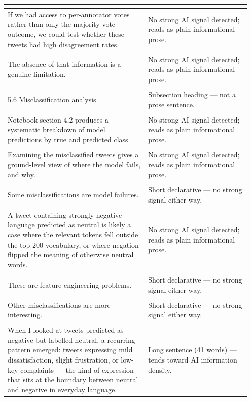 \documentclass[11pt]{article}
\begin{document}
\begin{longtable}{|p{0.55\linewidth}|p{0.40\linewidth}|}
\begin{itemize}[leftmargin=*,topsep=2pt,itemsep=1pt,parsep=0pt]
\end{itemize} & \\
\hline
If we had access to per-annotator votes rather than only the majority-vote outcome, we could test whether these tweets had high disagreement rates. & No strong AI signal detected; reads as plain informational prose. \\[2pt]
\hline
\rule{0pt}{3.5cm} & \\
\hline
The absence of that information is a genuine limitation. & No strong AI signal detected; reads as plain informational prose. \\[2pt]
\hline
\rule{0pt}{3.5cm} & \\
\hline
5.6 Misclassification analysis & Subsection heading --- not a prose sentence. \\[2pt]
\hline
\rule{0pt}{3.5cm} & \\
\hline
Notebook section 4.2 produces a systematic breakdown of model predictions by true and predicted class. & No strong AI signal detected; reads as plain informational prose. \\[2pt]
\hline
\rule{0pt}{3.5cm} & \\
\hline
Examining the misclassified tweets gives a ground-level view of where the model fails, and why. & No strong AI signal detected; reads as plain informational prose. \\[2pt]
\hline
\rule{0pt}{3.5cm} & \\
\hline
Some misclassifications are model failures. & Short declarative --- no strong signal either way. \\[2pt]
\hline
\rule{0pt}{3.5cm} & \\
\hline
A tweet containing strongly negative language predicted as neutral is likely a case where the relevant tokens fell outside the top-200 vocabulary, or where negation flipped the meaning of otherwise neutral words. & No strong AI signal detected; reads as plain informational prose. \\[2pt]
\hline
\rule{0pt}{3.5cm} & \\
\hline
These are feature engineering problems. & Short declarative --- no strong signal either way. \\[2pt]
\hline
\rule{0pt}{3.5cm} & \\
\hline
Other misclassifications are more interesting. & Short declarative --- no strong signal either way. \\[2pt]
\hline
\rule{0pt}{3.5cm} & \\
\hline
When I looked at tweets predicted as negative but labelled neutral, a recurring pattern emerged: tweets expressing mild dissatisfaction, slight frustration, or low-key complaints --- the kind of expression that sits at the boundary between neutral and negative in everyday language. & Long sentence (41 words) --- tends toward AI information density. \\[2pt]

\end{longtable}
\end{document}

